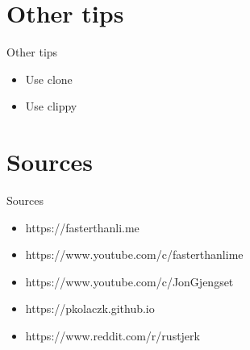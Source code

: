 \documentclass[
  9pt,
  ignorenonframetext,
]{beamer}
\providecommand{\tightlist}{%
  \setlength{\itemsep}{0pt}\setlength{\parskip}{0pt}}
\begin{document}
\hypertarget{other-tips}{%
\section{Other tips}\label{other-tips}}

\begin{frame}{Other tips}
\begin{itemize}
\tightlist
\item
  Use clone
\item
  Use clippy
\end{itemize}
\end{frame}

\hypertarget{sources}{%
\section{Sources}\label{sources}}

\begin{frame}{Sources}
\begin{itemize}
\tightlist
\item
  https://fasterthanli.me
\item
  https://www.youtube.com/c/fasterthanlime
\item
  https://www.youtube.com/c/JonGjengset
\item
  https://pkolaczk.github.io
\item
  https://www.reddit.com/r/rustjerk
\end{itemize}
\end{frame}
\end{document}
